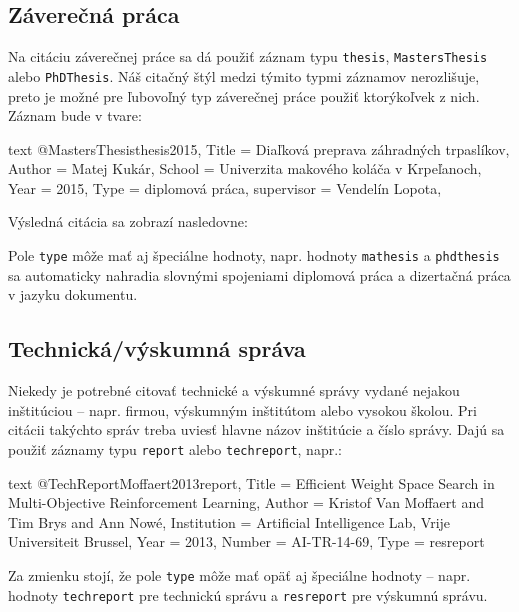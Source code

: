 \noindent[X] 

\subsection{Záverečná práca}

Na citáciu záverečnej práce sa dá použiť záznam typu \texttt{thesis}, \texttt{MastersThesis} alebo \texttt{PhDThesis}. Náš citačný štýl medzi týmito typmi záznamov nerozlišuje, preto je možné pre ľubovoľný typ záverečnej práce použiť ktorýkoľvek z nich. Záznam bude v tvare:
\begin{inlinecode}{text}
@MastersThesis{thesis2015,
  Title                    = {Diaľková preprava záhradných trpaslíkov},
  Author                   = {Matej Kukár},
  School                   = {Univerzita makového koláča v Krpeľanoch},
  Year                     = {2015},
  Type                     = {diplomová práca},
  supervisor               = {Vendelín Lopota},
}
\end{inlinecode}

Výsledná citácia sa zobrazí nasledovne:

\noindent[X] 

Pole \texttt{type} môže mať aj špeciálne hodnoty, napr. hodnoty \texttt{mathesis} a \texttt{phdthesis} sa automaticky nahradia slovnými spojeniami diplomová práca a dizertačná práca v jazyku dokumentu.

\subsection{Technická/výskumná správa}

Niekedy je potrebné citovať technické a výskumné správy vydané nejakou inštitúciou -- napr. firmou, výskumným inštitútom alebo vysokou školou. Pri citácii takýchto správ treba uviesť hlavne názov inštitúcie a číslo správy. Dajú sa použiť záznamy typu \texttt{report} alebo \texttt{techreport}, napr.:
\begin{inlinecode}{text}
@TechReport{Moffaert2013report,
  Title                    = {Efficient Weight Space Search in Multi-Objective Reinforcement Learning},
  Author                   = {Kristof Van Moffaert and Tim Brys and Ann Now{\'e}},
  Institution              = {Artificial Intelligence Lab, Vrije Universiteit Brussel},
  Year                     = {2013},
  Number                   = {AI-TR-14-69},
  Type                     = {resreport}
}
\end{inlinecode}
Za zmienku stojí, že pole \texttt{type} môže mať opäť aj špeciálne hodnoty -- napr. hodnoty \texttt{techreport} pre technickú správu a \texttt{resreport} pre výskumnú správu.

